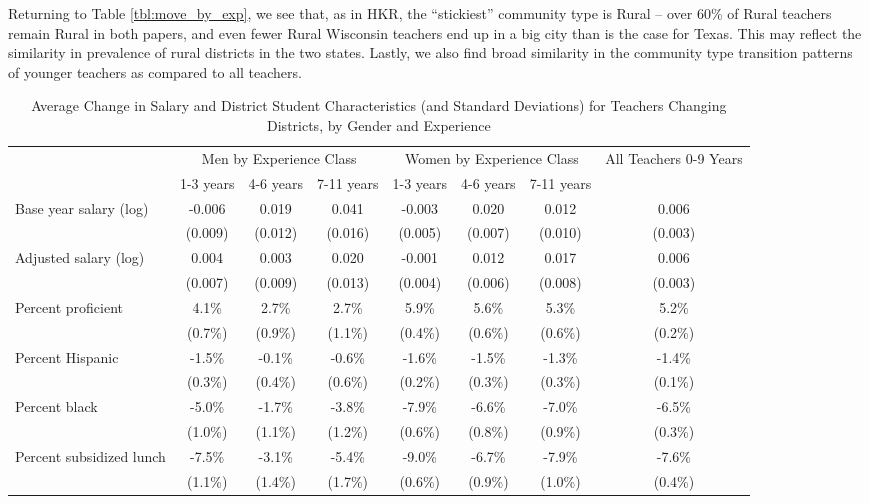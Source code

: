 \documentclass[12pt,]{article}
\begin{document}
Returning to Table \ref{tbl:move_by_exp}, we see that, as in HKR, the
``stickiest'' community type is Rural -- over 60\% of Rural teachers
remain Rural in both papers, and even fewer Rural Wisconsin teachers end
up in a big city than is the case for Texas. This may reflect the
similarity in prevalence of rural districts in the two states. Lastly,
we also find broad similarity in the community type transition patterns
of younger teachers as compared to all teachers.

\begin{sidewaystable}[htbp]
\centering
\begin{tabular}{lccccccc}
  \hline
 & \multicolumn{3}{c}{Men by Experience Class} & \multicolumn{3}{c}{Women by Experience Class} & \multirow{2}{*}{\parbox{0.09\linewidth}{All Teachers 0-9 Years}}\\ \cline{2-4} \cline{5-7}
 & 1-3 years & 4-6 years & 7-11 years & 1-3 years & 4-6 years & 7-11 years &  \\ 
  \hline
Base year salary (log) & -0.006 & 0.019 & 0.041 & -0.003 & 0.020 & 0.012 & 0.006 \\ 
   & (0.009) & (0.012) & (0.016) & (0.005) & (0.007) & (0.010) & (0.003) \\ 
  Adjusted salary (log) & 0.004 & 0.003 & 0.020 & -0.001 & 0.012 & 0.017 & 0.006 \\ 
   & (0.007) & (0.009) & (0.013) & (0.004) & (0.006) & (0.008) & (0.003) \\ 
  Percent proficient & 4.1\% & 2.7\% & 2.7\% & 5.9\% & 5.6\% & 5.3\% & 5.2\% \\ 
   & (0.7\%) & (0.9\%) & (1.1\%) & (0.4\%) & (0.6\%) & (0.6\%) & (0.2\%) \\ 
  Percent Hispanic & -1.5\% & -0.1\% & -0.6\% & -1.6\% & -1.5\% & -1.3\% & -1.4\% \\ 
   & (0.3\%) & (0.4\%) & (0.6\%) & (0.2\%) & (0.3\%) & (0.3\%) & (0.1\%) \\ 
  Percent black & -5.0\% & -1.7\% & -3.8\% & -7.9\% & -6.6\% & -7.0\% & -6.5\% \\ 
   & (1.0\%) & (1.1\%) & (1.2\%) & (0.6\%) & (0.8\%) & (0.9\%) & (0.3\%) \\ 
  Percent subsidized lunch & -7.5\% & -3.1\% & -5.4\% & -9.0\% & -6.7\% & -7.9\% & -7.6\% \\ 
   & (1.1\%) & (1.4\%) & (1.7\%) & (0.6\%) & (0.9\%) & (1.0\%) & (0.4\%) \\ 
   \hline
\end{tabular}
\caption{Average Change in Salary and District Student Characteristics (and Standard Deviations) for Teachers Changing Districts, by Gender and Experience} 
\label{tbl:change_by_ge}
\end{sidewaystable}
\end{document}
